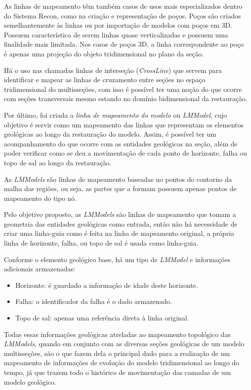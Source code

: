 As linhas de mapeamento têm também casos de usos mais especializados dentro do Sistema Recon, como na criação e representação de poços. Poços são criados semelhantemente às linhas ou por importação de modelos com poços em 3D. Possuem característica de serem linhas quase verticalizadas e possuem uma finalidade mais limitada. Nos casos de poços 3D, a linha correspondente ao poço é apenas uma projeção do objeto tridimensional no plano da seção.

Há o uso nas chamadas linhas de interseção (\textit{CrossLine}) que servem para identificar e mapear as linhas de cruzamento entre seções no espaço tridimensional do multisseções, com isso é possível ter uma noção do que ocorre com seções transversais mesmo estando no domínio bidimensional da restauração.

Por último, foi criada a \textit{linha de mapeamento do modelo} ou \textit{LMModel}, cujo objetivo é servir como um mapeamento das linhas que representam os elementos geológicas ao longo da restauração do modelo. Assim, é possível ter um acompanhamento do que ocorre com as entidades geológicas na seção, além de poder verificar como se deu a movimentação de cada ponto de horizonte, falha ou topo de sal ao longo da restauração.

As \textit{LMModels} são linhas de mapeamento baseadas no pontos do contorno da malha das regiões, ou seja, as partes que a formam possuem apenas pontos de mapeamento do tipo nó.

Pelo objetivo proposto, as \textit{LMModels} são linhas de mapeamento que tomam a geometria das entidades geológicas como entrada, então não há necessidade de criar uma linha-guia como é feita na linha de mapeamento original, a própria linha de horizonte, falha, ou topo de sal é usada como linha-guia.

Conforme o elemento geológico base, há um tipo de \textit{LMModel} e informações adicionais armazenadas:

\renewcommand{\labelitemi}{•}
\begin{itemize}
  \item Horizonte: é guardado a informação de idade deste horizonte.
  \item Falha: o identificador da falha é o dado armazenado.
  \item Topo de sal: apenas uma referência direta à linha original.
\end{itemize}

Todas essas informações  geológicas atreladas ao mapeamento topológico das \textit{LMModels}, quando em conjunto com as diversas seções geológicas de um modelo multisseções, são o que fazem dela o principal dado para a realização de um mapeamento de informações de evolução do modelo tridimensional ao longo do tempo, já que trazem todo o histórico de movimentação das camadas de um modelo geológico.


